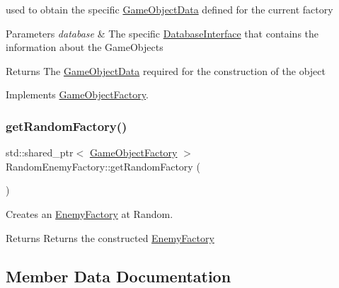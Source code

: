 used to obtain the specific \hyperlink{struct_game_object_data}{Game\+Object\+Data} defined for the current factory 


\begin{DoxyParams}{Parameters}
{\em database} & The specific \hyperlink{class_database_interface}{Database\+Interface} that contains the information about the Game\+Objects \\
\hline
\end{DoxyParams}
\begin{DoxyReturn}{Returns}
The \hyperlink{struct_game_object_data}{Game\+Object\+Data} required for the construction of the object 
\end{DoxyReturn}


Implements \hyperlink{class_game_object_factory_ae9358fbb3ef2d3b127320341760d3ff9}{Game\+Object\+Factory}.

\mbox{\label{class_random_enemy_factory_a8a9643918f3e727aac7e41c6187a9d9a}} 
\subsubsection{\texorpdfstring{get\+Random\+Factory()}{getRandomFactory()}}
{\footnotesize\ttfamily std\+::shared\+\_\+ptr$<$ \hyperlink{class_game_object_factory}{Game\+Object\+Factory} $>$ Random\+Enemy\+Factory\+::get\+Random\+Factory (\begin{DoxyParamCaption}{ }\end{DoxyParamCaption})\hspace{0.3cm}{\ttfamily [private]}}



Creates an \hyperlink{class_enemy_factory}{Enemy\+Factory} at Random. 

\begin{DoxyReturn}{Returns}
Returns the constructed \hyperlink{class_enemy_factory}{Enemy\+Factory} 
\end{DoxyReturn}


\subsection{Member Data Documentation}
\mbox{\label{class_random_enemy_factory_ad52b65e560c09a560d7be11c97997f5c}} 
